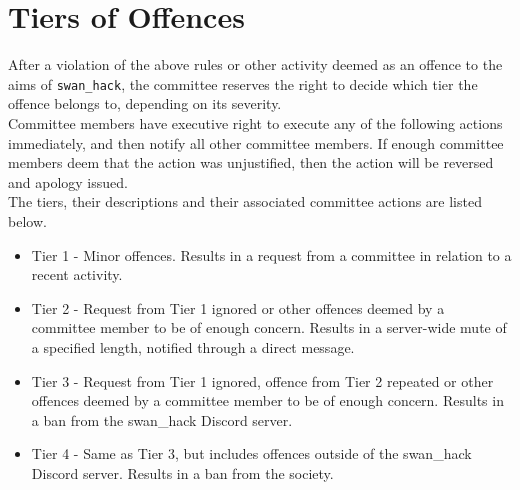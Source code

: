 \documentclass[12pt]{extarticle}
\begin{document}
	\section{Tiers of Offences}
	After a violation of the above rules or other activity deemed as an offence to the aims of \texttt{swan\_hack}, the committee reserves the right to decide which tier the offence belongs to, depending on its severity. \\
	Committee members have executive right to execute any of the following actions immediately, and then notify all other committee members. If enough committee members deem that the action was unjustified, then the action will be reversed and apology issued. \\
	The tiers, their descriptions and their associated committee actions are listed below.
	\begin{itemize}
	    \item Tier 1 - Minor offences. Results in a request from a committee in relation to a recent activity.
	    \item Tier 2 - Request from Tier 1 ignored or other offences deemed by a committee member to be of enough concern. Results in a server-wide mute of a specified length, notified through a direct message.
	    \item Tier 3 - Request from Tier 1 ignored, offence from Tier 2 repeated or other offences deemed by a committee member to be of enough concern. Results in a ban from the swan\_hack Discord server.
	    \item Tier 4 - Same as Tier 3, but includes offences outside of the swan\_hack Discord server. Results in a ban from the society. 
	\end{itemize}
	    
\end{document}
